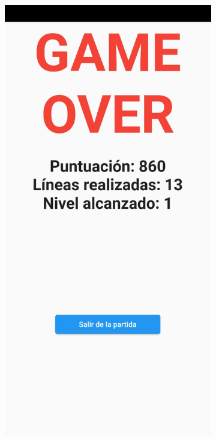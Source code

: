\documentclass{article}
\begin{document}
\begin{figure}[H]
  \begin{subfigure}{0.5\textwidth}
          \includegraphics[width=\textwidth]{imagenes/captura4.jpeg}

\end{subfigure}
\end{figure}
\end{document}
